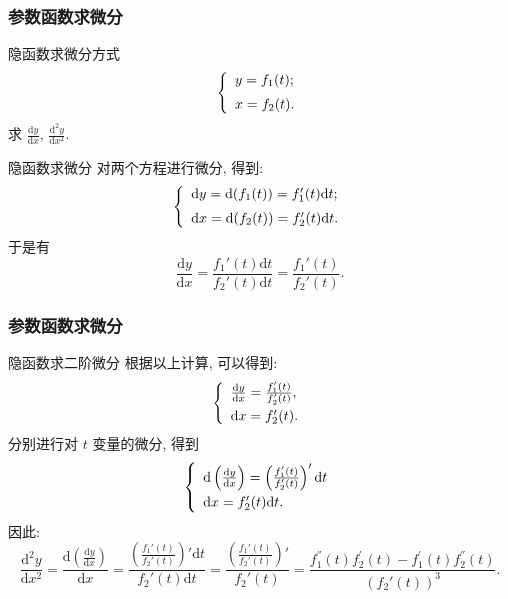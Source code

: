 \documentclass[
10pt,
aspectratio=43,
]{beamer}
\begin{document}
\begin{frame}
	\frametitle{参数函数求微分}
	\everymath{\displaystyle}
	\begin{block}{隐函数求微分方式}
		\begin{equation*}
			\left\{
			\begin{array}{ll}
				y=f_1(t);\vspace{0.2cm} \\
				x=f_2(t).
			\end{array}
			\right.
		\end{equation*}
		求 $\frac{\mathrm{d}y}{\mathrm{d}x}$, $\frac{\mathrm{d}^2y}{\mathrm{d}x^2}$.
	\end{block}
	\begin{exampleblock}{隐函数求微分}
		对两个方程进行微分, 得到:
		\begin{equation*}
			\left\{
			\begin{array}{ll}
				\mathrm{d}y=\mathrm{d}(f_1(t))=f_1'(t)\mathrm{d}t;\vspace{0.2cm} \\
				\mathrm{d}x=\mathrm{d}(f_2(t))=f_2'(t)\mathrm{d}t.
			\end{array}
			\right.
		\end{equation*}
		于是有
		$$
			\frac{\mathrm{d}y}{\mathrm{d}x}=\frac{f_1'(t)\mathrm{d}t}{f_2'(t)\mathrm{d}t}=\frac{f_1'(t)}{f_2'(t)}.
		$$
	\end{exampleblock}
\end{frame}

\begin{frame}
	\frametitle{参数函数求微分}
	\everymath{\displaystyle}
	\begin{exampleblock}{隐函数求二阶微分}
		根据以上计算, 可以得到:
		\begin{equation*}
			\left\{
			\begin{array}{ll}
				\frac{\mathrm{d}y}{\mathrm{d}x}=\frac{f_1'(t)}{f_2'(t)},\vspace{0.1cm} \\
				\mathrm{d}x=f_2'(t).
			\end{array}
			\right.
		\end{equation*}
		分别进行对 $t$ 变量的微分, 得到
		$$
			\left\{
			\begin{array}{ll}
				\mathrm{d}\left(\frac{\mathrm{d}y}{\mathrm{d}x}\right)=\left(\frac{f_1'(t)}{f_2'(t)}\right)'\mathrm{d}t\vspace{0.1cm} \\
				\mathrm{d}x=f_2'(t)\mathrm{d}t.
			\end{array}
			\right.
		$$
		因此:
		$$
			\frac{\mathrm{d}^2y}{\mathrm{d}x^2}=\frac{\mathrm{d}\left(\frac{\mathrm{d}y}{\mathrm{d}x}\right)}{\mathrm{d}x}=\frac{\left(\frac{f_1'(t)}{f_2'(t)}\right)'\mathrm{d}t}{f_2'(t)\mathrm{d}t}=\frac{\left(\frac{f_1'(t)}{f_2'(t)}\right)'}{f_2'(t)}=\frac{f_1^{''}(t)f_2^{'}(t)-f_1^{'}(t)f_2^{''}(t)}{\left(f_2'(t)\right)^3}.
		$$
	\end{exampleblock}
\end{frame}
\end{document}

